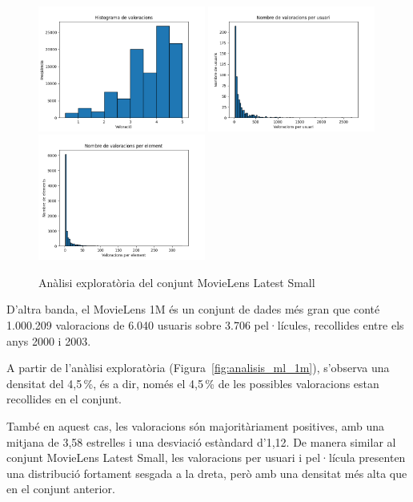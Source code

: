 \documentclass[a4paper,12pt]{report}
\begin{document}
\begin{figure}[H]
    \centering
    \includegraphics[width=0.49\textwidth]{Figuras/ml-small-ratings.png}
    \hfill
    \includegraphics[width=0.49\textwidth]{Figuras/ml-small-users.png}
    \hfill
    \includegraphics[width=0.49\textwidth]{Figuras/ml-small-items.png}
    \caption{Anàlisi exploratòria del conjunt MovieLens Latest Small}
    \label{fig:analisis_ml_small}
\end{figure}

D’altra banda, el MovieLens 1M és un conjunt de dades més gran que conté 1.000.209 valoracions de 6.040 usuaris sobre 3.706 pel·lícules, recollides entre els anys 2000 i 2003.

A partir de l’anàlisi exploratòria (Figura~\ref{fig:analisis_ml_1m}), s’observa una densitat del 4,5\,\%, és a dir, només el 4,5\,\% de les possibles valoracions estan recollides en el conjunt.

També en aquest cas, les valoracions són majoritàriament positives, amb una mitjana de 3,58 estrelles i una desviació estàndard d’1,12.
De manera similar al conjunt MovieLens Latest Small, les valoracions per usuari i pel·lícula presenten una distribució fortament sesgada a la dreta, però amb una densitat més alta que en el conjunt anterior.
\end{document}
